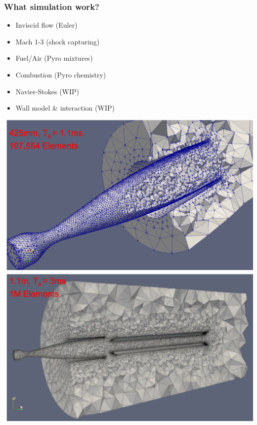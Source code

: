 \begin{frame}\frametitle{What simulation work?}
\begin{multicols}{2}
\begin{itemize}
\item Inviscid flow (Euler)
\item Mach 1-3 (shock capturing)
\item Fuel/Air (Pyro mixtures)
\item Combustion (Pyro chemistry)
\item Navier-Stokes (WIP)
\item Wall model \& interaction (WIP)
\end{itemize}
\columnbreak
\includegraphics[width=.5\textwidth]{figures/nozzlegrid_annotated2.png}\\
\includegraphics[width=.5\textwidth]{figures/y1grid_annotated.png}\\
\vspace{-10pt}
\begin{center}
\end{center}
\end{multicols}
\end{frame}

